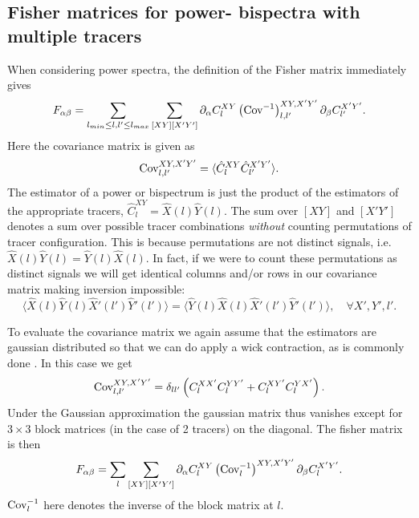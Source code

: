 \documentclass[11pt]{article} %
\DeclareRobustCommand{\Cov}{\ifmmode\text{Cov}\else d\fi}
\newcommand{\br}[1]{\ensuremath{\left( #1 \right)}}
\begin{document}

\subsection{Fisher matrices for power- bispectra with multiple tracers}
When considering power spectra, the definition of the Fisher matrix immediately gives 
\begin{equation*}
    F_{\alpha\beta} = \sum_{l_{min}\leq l, l' \leq l_{max}}\sum_{[XY][X'Y']} \partial_\alpha C_{l}^{XY} \br{\Cov^{-1}}^{XY, X'Y'}_{l, l'} \partial_\beta C^{X'Y'}_{l'}.
\end{equation*}
Here the covariance matrix is given as
\begin{equation*}
    \Cov^{XY, X'Y'}_{l, l'} = \langle \hat C^{XY}_{l} \hat C^{X'Y'}_{l'} \rangle.
\end{equation*}
The estimator of a power or bispectrum is just the product of the estimators of the appropriate tracers, $\hat C^{XY}_{l} = \hat X(l) \hat Y(l)$. The sum over $[XY]$ and $[X'Y']$ denotes a sum over possible tracer combinations \textit{without} counting permutations of tracer configuration. This is because permutations are not distinct signals, i.e. $\hat X(l) \hat Y(l) = \hat Y(l) \hat X(l)$. In fact, if we were to count these permutations as distinct signals we will get identical columns and/or rows in our covariance matrix making inversion impossible:
\begin{equation*}
    \langle \hat X(l) \hat Y (l) \hat X'(l') \hat Y' (l') \rangle = \langle \hat Y (l) \hat X (l) \hat X'(l') \hat Y' (l') \rangle, \quad \forall X', Y', l'. 
\end{equation*}

To evaluate the covariance matrix we again assume that the estimators are gaussian distributed so that we can do apply a wick contraction, as is commonly done \cite{tegmark1997cosmic}. In this case we get
\begin{equation*}
    \Cov^{XY, X'Y'}_{l, l'} = \delta_{ll'}\br{C^{XX'}_lC^{YY'}_l + C^{XY'}_lC^{YX'}_l}.
\end{equation*}
Under the Gaussian approximation the gaussian matrix thus vanishes except for $3\times 3$ block matrices (in the case of 2 tracers) on the diagonal. The fisher matrix is then
\begin{equation*}
    F_{\alpha\beta} = \sum_{l}\sum_{[XY][X'Y']} \partial_\alpha C_{l}^{XY} \br{\Cov^{-1}_l}^{XY, X'Y'} \partial_\beta C^{X'Y'}_{l}.
\end{equation*} 
$\Cov^{-1}_l$ here denotes the inverse of the block matrix at $l$.
\end{document}
